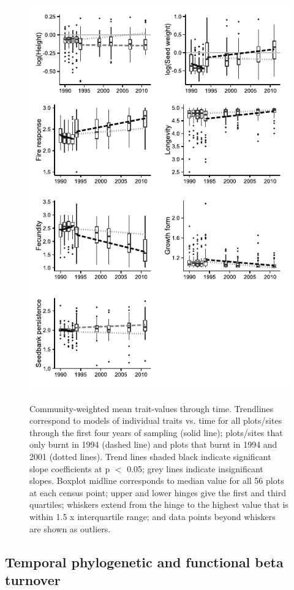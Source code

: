 \begin{figure}[H]
{\caption{\footnotesize Community-weighted mean trait-values through time. Trendlines correspond to models of individual traits vs. time for all plots/sites through the first four years of sampling (solid line); plots/sites that only burnt in 1994 (dashed line) and plots that burnt in 1994 and 2001 (dotted lines). Trend lines shaded black indicate significant slope coefficients at p $<$ 0.05; grey lines indicate insignificant slopes. Boxplot midline corresponds to median value for all 56 plots at each census point; upper and lower hinges give the first and third quartiles; whiskers extend from the hinge to the highest value that is within 1.5 x interquartile range; and data points beyond whiskers are shown as outliers.}\label{CWM}}
{\includegraphics[width=0.8\linewidth]{Chapter4/Figs/CWM.pdf}}
\end{figure}


\subsection{Temporal phylogenetic and functional beta turnover}

